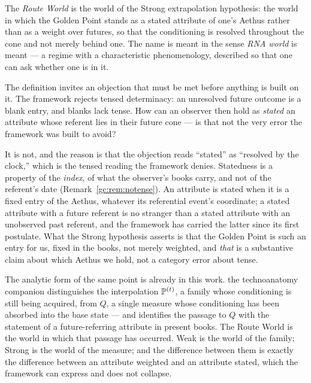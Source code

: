 \begin{definition}\label{gc:def:routeworld}
The \emph{Route World} is the world of the Strong extrapolation
hypothesis: the world in which the Golden Point stands as a stated
attribute of one's Aethus rather than as a weight over futures, so that
the conditioning is resolved throughout the cone and not merely behind
one. The name is meant in the sense \emph{RNA world} is meant --- a
regime with a characteristic phenomenology, described so that one can
ask whether one is in it.
\end{definition}

\begin{remark}\label{gc:rem:statedcoherent}
The definition invites an objection that must be met before anything is
built on it. The framework rejects tensed determinacy: an unresolved
future outcome is a blank entry, and blanks lack tense. How can an
observer then hold as \emph{stated} an attribute whose referent lies in
their future cone --- is that not the very error the framework was built
to avoid?

It is not, and the reason is that the objection reads ``stated'' as
``resolved by the clock,'' which is the tensed reading the framework
denies. Statedness is a property of the \emph{index}, of what the
observer's books carry, and not of the referent's date
(Remark~\ref{gc:rem:notense}). An attribute is stated when it is a fixed entry
of the Aethus, whatever its referential event's coordinate; a stated
attribute with a future referent is no stranger than a stated attribute
with an unobserved past referent, and the framework has carried the
latter since its first postulate. What the Strong hypothesis asserts is
that the Golden Point is such an entry for us, fixed in the books,
not merely weighted, and \emph{that} is a substantive claim about
which Aethus we hold, not a category error about tense.

The analytic form of the same point is already in this work.
the technoanatomy companion \cite{GoldenTechnoanatomy} distinguishes the interpolation
$\mathbb{P}^{(t)}$, a family whose conditioning is still being acquired, from
$Q$, a single measure whose conditioning has been absorbed into the base
state --- and identifies the passage to $Q$ with the statement of a
future-referring attribute in present books. The Route World is the
world in which that passage has occurred. Weak is the world of the
family; Strong is the world of the measure; and the difference between
them is exactly the difference between an attribute weighted and an
attribute stated, which the framework can express and does not collapse.
\end{remark}

